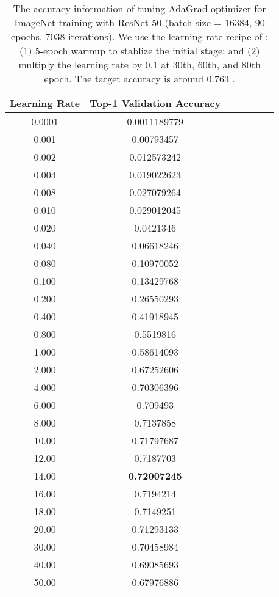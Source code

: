 \documentclass{article} \usepackage{iclr2020_conference,times}
\begin{document}
\begin{table}[ht]
\renewcommand{\arraystretch}{1.3}
\caption{The accuracy information of tuning AdaGrad optimizer for ImageNet training with ResNet-50 (batch size = 16384, 90 epochs, 7038 iterations). We use the learning rate recipe of \citep{goyal2017accurate}: (1) 5-epoch warmup to stablize the initial stage; and (2) multiply the learning rate by 0.1 at 30th, 60th, and 80th epoch. The target accuracy is around 0.763 \citep{goyal2017accurate}.}
\centering
\begin{tabular}{|c|c|c|c|c|c|c|}
\hline
Learning Rate & Top-1 Validation Accuracy \\
\hline
\hline
0.0001 & 0.0011189779 \\
\hline
0.001 & 0.00793457 \\
\hline
0.002 & 0.012573242 \\
\hline
0.004 & 0.019022623 \\
\hline
0.008 & 0.027079264 \\
\hline
0.010 & 0.029012045 \\
\hline
0.020 & 0.0421346 \\
\hline
0.040 & 0.06618246 \\
\hline
0.080 & 0.10970052 \\
\hline
0.100 & 0.13429768 \\
\hline
0.200 & 0.26550293 \\
\hline
0.400 & 0.41918945 \\
\hline
0.800 & 0.5519816 \\
\hline
1.000 & 0.58614093 \\
\hline
2.000 & 0.67252606 \\
\hline
4.000 & 0.70306396 \\
\hline
6.000 & 0.709493 \\
\hline
8.000 & 0.7137858 \\
\hline
10.00 & 0.71797687 \\
\hline
12.00 & 0.7187703 \\
\hline
14.00 & {\bf 0.72007245} \\
\hline
16.00 & 0.7194214 \\
\hline
18.00 & 0.7149251 \\
\hline
20.00 & 0.71293133 \\
\hline
30.00 & 0.70458984 \\
\hline
40.00 & 0.69085693 \\
\hline
50.00 & 0.67976886 \\
\hline
\end{tabular}
\label{table:imagenet_adagrad_tuning_2}
\end{table}
\end{document}

